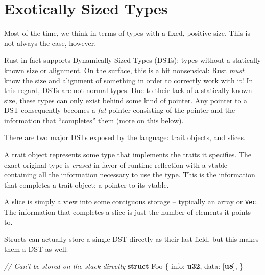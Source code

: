 \documentclass[a4paper,]{book}
\newenvironment{Shaded}{\begin{snugshade}}{\end{snugshade}}
\newcommand{\KeywordTok}[1]{\textcolor[rgb]{0.13,0.29,0.53}{\textbf{{#1}}}}
\newcommand{\CommentTok}[1]{\textcolor[rgb]{0.56,0.35,0.01}{\textit{{#1}}}}
\newcommand{\NormalTok}[1]{{#1}}
\begin{document}
\section{Exotically Sized Types}\label{sec--exotic-sizes}

Most of the time, we think in terms of types with a fixed, positive
size. This is not always the case, however.


Rust in fact supports Dynamically Sized Types (DSTs): types without a
statically known size or alignment. On the surface, this is a bit
nonsensical: Rust \emph{must} know the size and alignment of something
in order to correctly work with it! In this regard, DSTs are not normal
types. Due to their lack of a statically known size, these types can
only exist behind some kind of pointer. Any pointer to a DST
consequently becomes a \emph{fat} pointer consisting of the pointer and
the information that ``completes'' them (more on this below).

There are two major DSTs exposed by the language: trait objects, and
slices.

A trait object represents some type that implements the traits it
specifies. The exact original type is \emph{erased} in favor of runtime
reflection with a vtable containing all the information necessary to use
the type. This is the information that completes a trait object: a
pointer to its vtable.

A slice is simply a view into some contiguous storage -- typically an
array or \texttt{Vec}. The information that completes a slice is just
the number of elements it points to.

Structs can actually store a single DST directly as their last field,
but this makes them a DST as well:

\begin{Shaded}
\begin{Highlighting}[]
\CommentTok{// Can't be stored on the stack directly}
\KeywordTok{struct} \NormalTok{Foo \{}
    \NormalTok{info: }\KeywordTok{u32}\NormalTok{,}
    \NormalTok{data: [}\KeywordTok{u8}\NormalTok{],}
\NormalTok{\}}
\end{Highlighting}
\end{Shaded}
\end{document}
